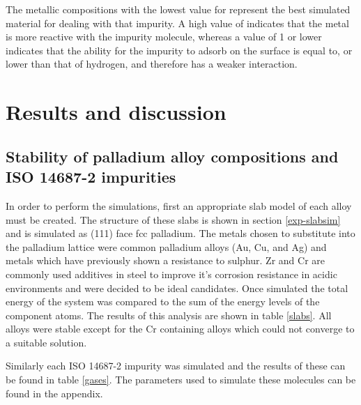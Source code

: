 The metallic compositions with the lowest value for \textsigma \phantom{i} represent the best simulated material for dealing with that impurity. A high value of \textsigma \phantom{i}  indicates that the metal is more reactive with the impurity molecule, whereas a \textsigma \phantom{i} value of 1 or lower indicates that the ability for the impurity to adsorb on the surface is equal to, or lower than that of hydrogen, and therefore has a weaker interaction. 

\section{Results and discussion}
\subsection{Stability of palladium alloy compositions and ISO 14687-2 impurities}
In order to perform the simulations, first an appropriate slab model of each alloy must be created. The structure of these slabs is shown in section \ref{exp-slabsim} and is simulated as (111) face fcc palladium. The metals chosen to substitute into the palladium lattice were common palladium alloys (Au, Cu, and Ag) and metals which have previously shown a resistance to sulphur. Zr\cite{SHIN2018102} and Cr\cite{MARCUS1990377} are commonly used additives in steel to improve it's corrosion resistance in acidic environments and were decided to be ideal candidates. Once simulated the total energy of the system was compared to the sum of the energy levels of the component atoms. The results of this analysis are shown in table \ref{slabs}. All alloys were stable except for the Cr containing alloys which could not converge to a suitable solution. 

Similarly each ISO 14687-2 impurity was simulated and the results of these can be found in table \ref{gases}. The parameters used to simulate these molecules can be found in the appendix.

